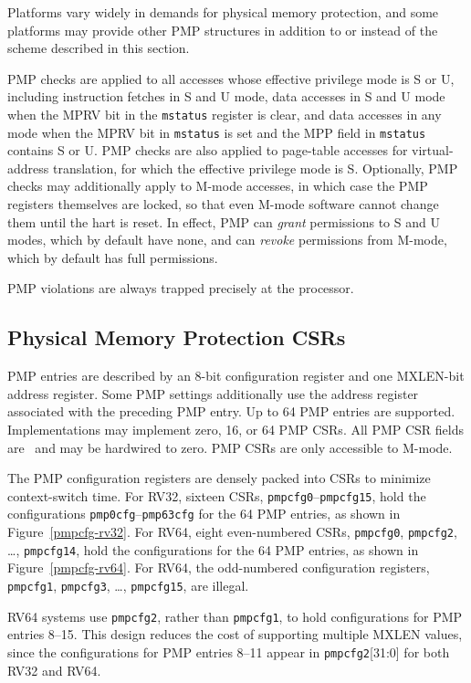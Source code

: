 \begin{commentary}
Platforms vary widely in demands for physical memory protection, and
some platforms may provide other PMP structures in addition to or
instead of the scheme described in this section.
\end{commentary}

PMP checks are applied to all accesses whose effective privilege mode is S or
U, including instruction fetches in S and U mode, data accesses in S and
U mode when the MPRV bit in the {\tt mstatus} register is clear, and data
accesses in any mode when the MPRV bit in {\tt mstatus} is set and the MPP
field in {\tt mstatus} contains S or U.
PMP checks are also applied to page-table
accesses for virtual-address translation, for which the effective
privilege mode is S.  Optionally, PMP checks may additionally apply
to M-mode accesses, in which case the PMP registers themselves are
locked, so that even M-mode software cannot change them until the hart is
reset.  In effect, PMP can {\em grant} permissions to S and U
modes, which by default have none, and can {\em revoke} permissions
from M-mode, which by default has full permissions.

PMP violations are always trapped precisely at the processor.

\subsection{Physical Memory Protection CSRs}

PMP entries are described by an 8-bit configuration register and one MXLEN-bit
address register.  Some PMP settings additionally use the address register
associated with the preceding PMP entry.
Up to 64 PMP entries are supported.
Implementations may implement zero, 16, or 64 PMP CSRs.
All PMP CSR fields are \warl\ and may be hardwired to zero.
PMP CSRs are only accessible to M-mode.

The PMP configuration registers are densely packed into CSRs to minimize
context-switch time.
For RV32, sixteen CSRs, {\tt pmpcfg0}--{\tt pmpcfg15}, hold the configurations
{\tt pmp0cfg}--{\tt pmp63cfg} for the 64 PMP entries, as shown in
Figure~\ref{pmpcfg-rv32}.
For RV64, eight even-numbered CSRs,
{\tt pmpcfg0}, {\tt pmpcfg2}, \ldots, {\tt pmpcfg14}, hold the configurations
for the 64 PMP entries, as shown in Figure~\ref{pmpcfg-rv64}.
For RV64, the odd-numbered configuration registers,
{\tt pmpcfg1}, {\tt pmpcfg3}, \ldots, {\tt pmpcfg15}, are illegal.

\begin{commentary}
RV64 systems use {\tt pmpcfg2}, rather than {\tt pmpcfg1}, to hold
configurations for PMP entries 8--15.  This design reduces the cost of
supporting multiple MXLEN values, since the configurations for PMP
entries 8--11 appear in {\tt pmpcfg2}[31:0] for both RV32 and RV64.
\end{commentary}

